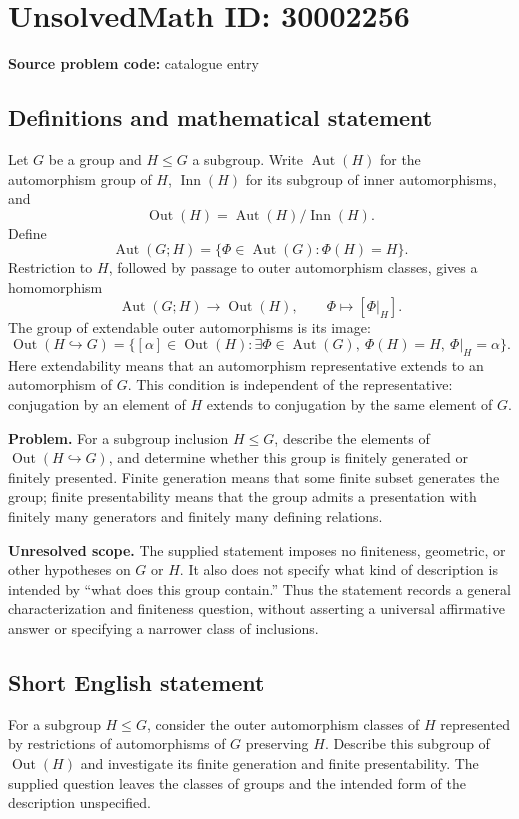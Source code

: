 \documentclass[11pt]{article}
\begin{document}
\section*{UnsolvedMath ID: 30002256}
\textbf{Source problem code:} catalogue entry
\subsection{Definitions and mathematical statement}
Let \(G\) be a group and \(H\leq G\) a subgroup. Write \(\operatorname{Aut}(H)\) for the automorphism group of \(H\), \(\operatorname{Inn}(H)\) for its subgroup of inner automorphisms, and
\[
\operatorname{Out}(H)=\operatorname{Aut}(H)/\operatorname{Inn}(H).
\]
Define
\[
\operatorname{Aut}(G;H)=\{\Phi\in\operatorname{Aut}(G):\Phi(H)=H\}.
\]
Restriction to \(H\), followed by passage to outer automorphism classes, gives a homomorphism
\[
\operatorname{Aut}(G;H)\longrightarrow\operatorname{Out}(H),
\qquad \Phi\longmapsto[\Phi|_H].
\]
The group of extendable outer automorphisms is its image:
\[
\operatorname{Out}(H\hookrightarrow G)
=\bigl\{[\alpha]\in\operatorname{Out}(H):
\exists\Phi\in\operatorname{Aut}(G),\ 
\Phi(H)=H,\ \Phi|_H=\alpha\bigr\}.
\]
Here extendability means that an automorphism representative extends to an automorphism of \(G\). This condition is independent of the representative: conjugation by an element of \(H\) extends to conjugation by the same element of \(G\).

\textbf{Problem.} For a subgroup inclusion \(H\leq G\), describe the elements of \(\operatorname{Out}(H\hookrightarrow G)\), and determine whether this group is finitely generated or finitely presented. Finite generation means that some finite subset generates the group; finite presentability means that the group admits a presentation with finitely many generators and finitely many defining relations.

\textbf{Unresolved scope.} The supplied statement imposes no finiteness, geometric, or other hypotheses on \(G\) or \(H\). It also does not specify what kind of description is intended by ``what does this group contain.'' Thus the statement records a general characterization and finiteness question, without asserting a universal affirmative answer or specifying a narrower class of inclusions.
\subsection{Short English statement}
For a subgroup \(H\leq G\), consider the outer automorphism classes of \(H\) represented by restrictions of automorphisms of \(G\) preserving \(H\). Describe this subgroup of \(\operatorname{Out}(H)\) and investigate its finite generation and finite presentability. The supplied question leaves the classes of groups and the intended form of the description unspecified.
\end{document}
